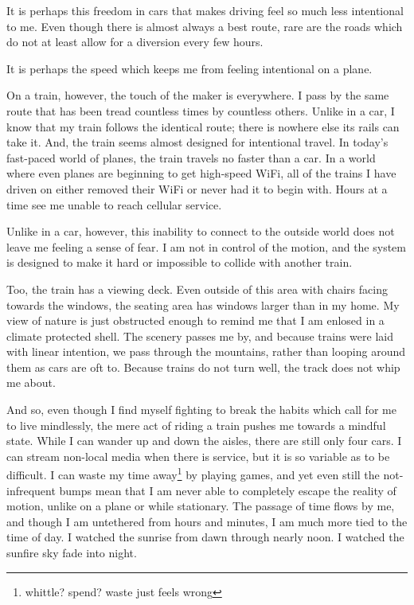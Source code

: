 \documentclass[12pt]{article}
\renewcommand{\,}{\textsuperscript{,}}
\begin{document}
It is perhaps this freedom in cars that makes driving feel so much less intentional to me.
Even though there is almost always a best route, rare are the roads which do not at least allow for a diversion every few hours.

It is perhaps the speed which keeps me from feeling intentional on a plane.

On a train, however, the touch of the maker is everywhere.
I pass by the same route that has been tread countless times by countless others.
Unlike in a car, I know that my train follows the identical route; there is nowhere else its rails can take it.
And, the train seems almost designed for intentional travel.
In today's fast-paced world of planes, the train travels no faster than a car.
In a world where even planes are beginning to get high-speed WiFi, all of the trains I have driven on either removed their WiFi or never had it to begin with.
Hours at a time see me unable to reach cellular service.

Unlike in a car, however, this inability to connect to the outside world does not leave me feeling a sense of fear.
I am not in control of the motion, and the system is designed to make it hard or impossible to collide with another train.

Too, the train has a viewing deck.
Even outside of this area with chairs facing towards the windows, the seating area has windows larger than in my home.
My view of nature is just obstructed enough to remind me that I am enlosed in a climate protected shell.
The scenery passes me by, and because trains were laid with linear intention, we pass through the mountains, rather than looping around them as cars are oft to.
Because trains do not turn well, the track does not whip me about.

And so, even though I find myself fighting to break the habits which call for me to live mindlessly, the mere act of riding a train pushes me towards a mindful state.
While I can wander up and down the aisles, there are still only four cars.
I can stream non-local media when there is service, but it is so variable as to be difficult.
I can waste my time away\footnote{whittle? spend? waste just feels wrong} by playing games, and yet even still the not-infrequent bumps mean that I am never able to completely escape the reality of motion, unlike on a plane or while stationary.
The passage of time flows by me, and though I am untethered from hours and minutes, I am much more tied to the time of day.
I watched the sunrise from dawn through nearly noon.
I watched the sunfire sky fade into night.
\end{document}
